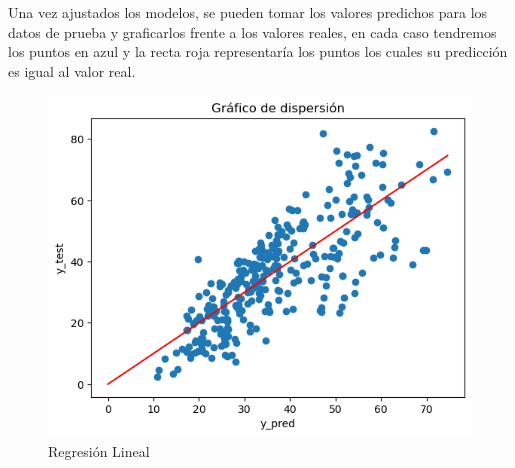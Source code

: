 \noindent Una vez ajustados los modelos, se pueden tomar los valores predichos para los datos de prueba y graficarlos frente a los valores reales, en cada caso tendremos los puntos en azul y la recta roja representaría los puntos los cuales su predicción es igual al valor real. 

\begin{figure}[ht]
  \centering
  \begin{minipage}{0.32\textwidth}
   
    \includegraphics[width=\textwidth]{Documentos Extra/Imagenes/Datos PruebasRegresionLineal.png}
    \caption{Regresión Lineal}
    \label{fig:regresion_lineal}
  \end{minipage}
  \hfill
  \begin{minipage}{0.32\textwidth}
  

\end{minipage}
\end{figure}
